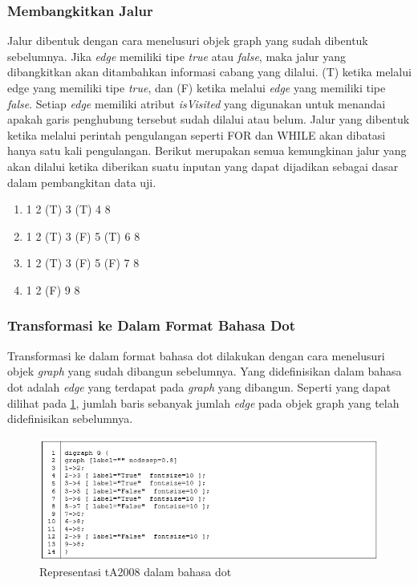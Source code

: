 \subsubsection*{Membangkitkan Jalur}
Jalur dibentuk dengan cara menelusuri objek graph yang sudah dibentuk sebelumnya. Jika \textit{edge} memiliki tipe \textit{true} atau \textit{false}, maka jalur yang dibangkitkan akan ditambahkan informasi cabang yang dilalui. (T) ketika melalui edge yang memiliki tipe \textit{true}, dan (F)  ketika melalui \textit{edge} yang memiliki tipe \textit{false}. Setiap \textit{edge} memiliki atribut \textit{isVisited} yang digunakan untuk menandai apakah garis penghubung tersebut sudah dilalui atau belum. Jalur yang dibentuk ketika melalui perintah pengulangan seperti FOR dan WHILE akan dibatasi hanya satu kali pengulangan. Berikut merupakan semua kemungkinan jalur yang akan dilalui ketika diberikan suatu inputan yang dapat dijadikan sebagai dasar dalam pembangkitan data uji.
\begin{enumerate}[noitemsep] 
	\item 1 2 (T) 3 (T) 4 8
	\item 1 2 (T) 3 (F) 5 (T) 6 8
	\item 1 2 (T) 3 (F) 5 (F) 7 8
	\item 1 2 (F) 9 8
\end{enumerate}

\subsubsection*{Transformasi ke Dalam Format Bahasa Dot}
Transformasi ke dalam format bahasa dot dilakukan dengan cara menelusuri objek \textit{graph} yang sudah dibangun sebelumnya. Yang didefinisikan dalam bahasa dot adalah \textit{edge} yang terdapat pada \textit{graph} yang dibangun. Seperti yang dapat dilihat pada \ref{fig:dot}, jumlah baris sebanyak jumlah \textit{edge} pada objek graph yang telah didefinisikan sebelumnya.
\begin{figure}
	\centering
	\includegraphics[width=0.9\linewidth]{gambar/dot}
	\caption{Representasi tA2008 dalam bahasa dot}
	\label{fig:dot}
\end{figure}

